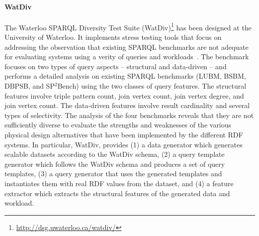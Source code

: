 \paragraph{WatDiv} The Waterloo SPARQL Diversity Test Suite (WatDiv)\footnote{\url{http://dsg.uwaterloo.ca/watdiv/}} has been designed at the University of Waterloo. It implements stress testing tools that focus on addressing the observation that existing SPARQL benchmarks are not adequate for evaluating systems using a verity of queries and  workloads~\cite{Aluc:2014:DST:2717213.2717229}. The benchmark focuses on two types of query aspects -- structural and data-driven -- and performs a detailed analysis on existing SPARQL benchmarks (LUBM, BSBM, DBPSB, and SP$^2$Bench) using the two classes of query features. The structural features involve triple pattern count, join vertex count, join vertex degree, and join vertex count. The data-driven features involve result cardinality and several types of selectivity. The analysis of the four benchmarks reveals that they are not sufficiently diverse to evaluate the strengths and weaknesses of the various physical design alternatives that have been implemented by the different RDF systems. In particular, WatDiv, provides (1) a data generator which generates scalable datasets according to the WatDiv schema, (2) a query template generator which follows the WatDiv schema and produces a  set of query templates, (3) a query generator that uses the generated templates and instantiates them  with real RDF values from the dataset, and (4) a feature extractor which extracts the structural features of the generated data and workload. %

